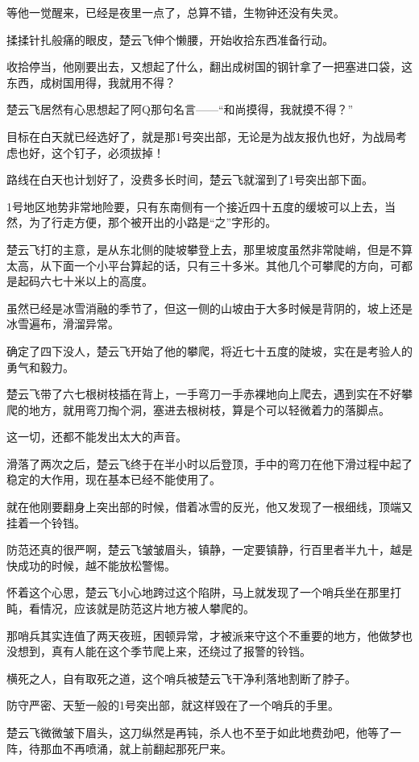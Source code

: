 等他一觉醒来，已经是夜里一点了，总算不错，生物钟还没有失灵。

揉揉针扎般痛的眼皮，楚云飞伸个懒腰，开始收拾东西准备行动。

收拾停当，他刚要出去，又想起了什么，翻出成树国的钢针拿了一把塞进口袋，这东西，成树国用得，我就用不得？

楚云飞居然有心思想起了阿Q那句名言——“和尚摸得，我就摸不得？”

目标在白天就已经选好了，就是那1号突出部，无论是为战友报仇也好，为战局考虑也好，这个钉子，必须拔掉！

路线在白天也计划好了，没费多长时间，楚云飞就溜到了1号突出部下面。

1号地区地势非常地险要，只有东南侧有一个接近四十五度的缓坡可以上去，当然，为了行走方便，那个被开出的小路是“之”字形的。

楚云飞打的主意，是从东北侧的陡坡攀登上去，那里坡度虽然非常陡峭，但是不算太高，从下面一个小平台算起的话，只有三十多米。其他几个可攀爬的方向，可都是起码六七十米以上的高度。

虽然已经是冰雪消融的季节了，但这一侧的山坡由于大多时候是背阴的，坡上还是冰雪遍布，滑溜异常。

确定了四下没人，楚云飞开始了他的攀爬，将近七十五度的陡坡，实在是考验人的勇气和毅力。

楚云飞带了六七根树枝插在背上，一手弯刀一手赤裸地向上爬去，遇到实在不好攀爬的地方，就用弯刀掏个洞，塞进去根树枝，算是个可以轻微着力的落脚点。

这一切，还都不能发出太大的声音。

滑落了两次之后，楚云飞终于在半小时以后登顶，手中的弯刀在他下滑过程中起了稳定的大作用，现在基本已经不能使用了。

就在他刚要翻身上突出部的时候，借着冰雪的反光，他又发现了一根细线，顶端又挂着一个铃铛。

防范还真的很严啊，楚云飞皱皱眉头，镇静，一定要镇静，行百里者半九十，越是快成功的时候，越不能放松警惕。

怀着这个心思，楚云飞小心地跨过这个陷阱，马上就发现了一个哨兵坐在那里打盹，看情况，应该就是防范这片地方被人攀爬的。

那哨兵其实连值了两天夜班，困顿异常，才被派来守这个不重要的地方，他做梦也没想到，真有人能在这个季节爬上来，还绕过了报警的铃铛。

横死之人，自有取死之道，这个哨兵被楚云飞干净利落地割断了脖子。

防守严密、天堑一般的1号突出部，就这样毁在了一个哨兵的手里。

楚云飞微微皱下眉头，这刀纵然是再钝，杀人也不至于如此地费劲吧，他等了一阵，待那血不再喷涌，就上前翻起那死尸来。

